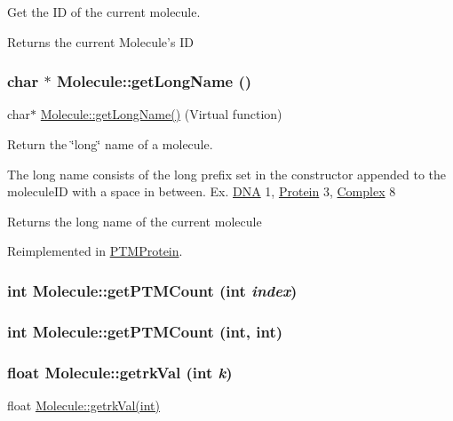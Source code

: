 Get the ID of the current molecule.

\begin{DoxyReturn}{Returns}
the current Molecule's ID 
\end{DoxyReturn}
\hypertarget{classMolecule_a6d3c3fd4827a62dacfd9d7a7d3a7f6ea}{
\subsubsection[{getLongName}]{\setlength{\rightskip}{0pt plus 5cm}char $\ast$ Molecule::getLongName ()}}
\label{classMolecule_a6d3c3fd4827a62dacfd9d7a7d3a7f6ea}
char$\ast$ \hyperlink{classMolecule_a6d3c3fd4827a62dacfd9d7a7d3a7f6ea}{Molecule::getLongName()} (Virtual function)

Return the \char`\"{}long\char`\"{} name of a molecule.

The long name consists of the long prefix set in the constructor appended to the moleculeID with a space in between. Ex. \hyperlink{classDNA}{DNA} 1, \hyperlink{classProtein}{Protein} 3, \hyperlink{classComplex}{Complex} 8

\begin{DoxyReturn}{Returns}
the long name of the current molecule 
\end{DoxyReturn}


Reimplemented in \hyperlink{classPTMProtein_a933492fe6252149290b4a2e9885588da}{PTMProtein}.\hypertarget{classMolecule_a7a8b15817d1f1baafe07b50c29cbbc9d}{
\subsubsection[{getPTMCount}]{\setlength{\rightskip}{0pt plus 5cm}int Molecule::getPTMCount (int {\em index})}}
\label{classMolecule_a7a8b15817d1f1baafe07b50c29cbbc9d}
\hypertarget{classMolecule_ae946ae8bea91c5893ad9bf0fb66b6e0d}{
\subsubsection[{getPTMCount}]{\setlength{\rightskip}{0pt plus 5cm}int Molecule::getPTMCount (int, \/  int)}}
\label{classMolecule_ae946ae8bea91c5893ad9bf0fb66b6e0d}
\hypertarget{classMolecule_a66d5e242462b12c0a742fedec0a6bf78}{
\subsubsection[{getrkVal}]{\setlength{\rightskip}{0pt plus 5cm}float Molecule::getrkVal (int {\em k})}}
\label{classMolecule_a66d5e242462b12c0a742fedec0a6bf78}
float \hyperlink{classMolecule_a66d5e242462b12c0a742fedec0a6bf78}{Molecule::getrkVal(int)}

